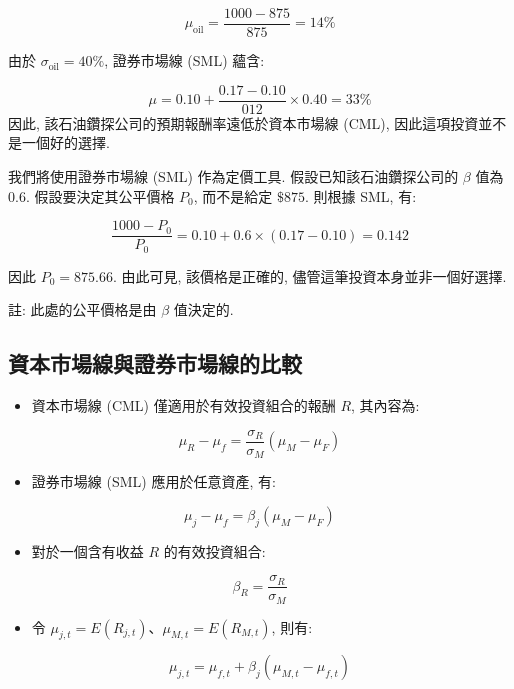 \documentclass[letterpaper]{article}
\begin{document}
		$$
		\mu_{\text{oil}}=\frac{1000-875}{875}=14\%
		$$
		
		由於 $\sigma_{\text{oil}}=40\%$, 證券市場線 (SML) 蘊含: 
		
		
		$$
		\mu=0.10+\frac{0.17-0.10}{012} \times 0.40=33 \%
		$$
		因此, 該石油鑽探公司的預期報酬率遠低於資本市場線 (CML), 因此這項投資並不是一個好的選擇. 
		
		我們將使用證券市場線 (SML) 作為定價工具. 假設已知該石油鑽探公司的 $\beta$ 值為 0.6.   
		假設要決定其公平價格 $P_{0}$, 而不是給定 $\$875$.   
		則根據 SML, 有: 
		
		$$
		\frac{1000-P_{0}}{P_{0}} = 0.10 + 0.6 \times  (0.17 - 0.10) = 0.142
		$$
		
		因此 $P_{0} = 875.66$.   
		由此可見, 該價格是正確的, 儘管這筆投資本身並非一個好選擇. 
		
		註: 此處的公平價格是由 $\beta$ 值決定的. 
		
		\subsection{資本市場線與證券市場線的比較}
		\begin{itemize}
			\item 資本市場線 (CML) 僅適用於有效投資組合的報酬 $R$, 其內容為: 
		\end{itemize}
		
		$$
		\mu_{R}-\mu_{f}=\frac{\sigma_{R}}{\sigma_{M}}\left (\mu_{M}-\mu_{F}\right) 
		$$
		
		\begin{itemize}
			\item  證券市場線 (SML) 應用於任意資產, 有: 
		\end{itemize}
		
		$$
		\mu_{j}-\mu_{f}=\beta_{j}\left (\mu_{M}-\mu_{F}\right) 
		$$
		
		\begin{itemize}
			\item 對於一個含有收益 $R$ 的有效投資組合: 
		\end{itemize}
		
		$$
		\beta_{R}=\frac{\sigma_{R}}{\sigma_{M}}
		$$
		
	\begin{itemize}
		\item 令 $\mu_{j, t}=E\left (R_{j, t}\right)$、$\mu_{M, t}=E\left (R_{M, t}\right)$, 則有:
	\end{itemize}
		
		$$
		\mu_{j, t}=\mu_{f, t}+\beta_{j}\left (\mu_{M, t}-\mu_{f, t}\right) 
		$$
		
\end{document}
